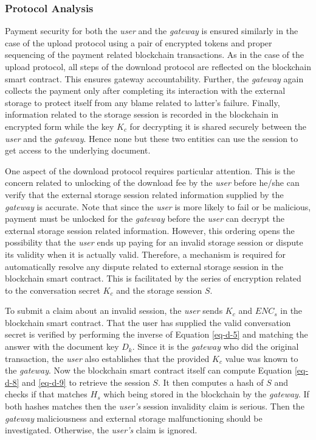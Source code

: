 \subsubsection*{Protocol Analysis}
Payment security for both the {\it user} and the {\it gateway} is ensured similarly in the case of the upload protocol using a pair of encrypted tokens and proper sequencing of the payment related blockchain transactions. As in the case of the upload protocol, all steps of the download protocol are reflected on the blockchain smart contract. This ensures gateway accountability. Further, the {\it gateway} again collects the payment only after completing its interaction with the external storage to protect itself from any blame related to latter's failure. Finally, information related to the storage session  is recorded in the blockchain in encrypted form while the key $K_c$ for decrypting it is shared securely between the {\it user} and the {\it gateway}. Hence none but these two entities can use the session to get access to the underlying document.

One aspect of the download protocol requires particular attention. This is the concern related to unlocking of the download fee by the {\it user} before he/she can verify that the external storage session related information supplied by the {\it gateway} is accurate. Note that since the {\it user} is more likely to fail or be malicious, payment must be unlocked for the {\it gateway} before the {\it user} can decrypt the external storage session related information. However, this ordering opens the possibility that the {\it user} ends up paying for an invalid storage session or dispute its validity when it is actually valid. Therefore, a mechanism is required for automatically resolve any dispute related to external storage session in the blockchain smart contract. This is facilitated by the series of encryption related to the conversation secret $K_c$ and the storage session $S$.

To submit a claim about an invalid session, the {\it user} sends $K_c$ and $ENC_s$ in the blockchain smart contract. That the user has supplied the valid conversation secret is verified by performing the inverse of Equation \ref{eq-d-5} and matching the answer with the document key $D_k$. Since it is the {\it gateway} who did the original transaction, the {\it user} also establishes that the provided $K_c$ value was known to the {\it gateway}. Now the blockchain smart contract itself can compute Equation \ref{eq-d-8} and \ref{eq-d-9} to retrieve the session $S$. It then computes a hash of $S$ and checks if that matches $H_s$ which being stored in the blockchain by the {\it gateway}. If both hashes matches then the {\it user's} session invalidity claim is serious. Then the {\it gateway} maliciousness and external storage  malfunctioning should be investigated. Otherwise, the {\it user's} claim is ignored.          

